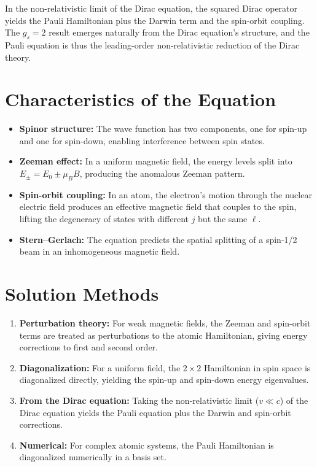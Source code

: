 In the non-relativistic limit of the Dirac equation, the squared Dirac operator yields the Pauli Hamiltonian plus the Darwin term and the spin-orbit coupling. The $g_s = 2$ result emerges naturally from the Dirac equation's structure, and the Pauli equation is thus the leading-order non-relativistic reduction of the Dirac theory.

\section*{Characteristics of the Equation}

\begin{itemize}
  \item \textbf{Spinor structure:} The wave function has two components, one for spin-up and one for spin-down, enabling interference between spin states.
  \item \textbf{Zeeman effect:} In a uniform magnetic field, the energy levels split into $E_{\pm} = E_{0} \pm \mu_{B}B$, producing the anomalous Zeeman pattern.
  \item \textbf{Spin-orbit coupling:} In an atom, the electron's motion through the nuclear electric field produces an effective magnetic field that couples to the spin, lifting the degeneracy of states with different $j$ but the same $\ell$.
  \item \textbf{Stern--Gerlach:} The equation predicts the spatial splitting of a spin-1/2 beam in an inhomogeneous magnetic field.
\end{itemize}
\section*{Solution Methods}

\begin{enumerate}
  \item \textbf{Perturbation theory:} For weak magnetic fields, the Zeeman and spin-orbit terms are treated as perturbations to the atomic Hamiltonian, giving energy corrections to first and second order.
  \item \textbf{Diagonalization:} For a uniform field, the $2\times 2$ Hamiltonian in spin space is diagonalized directly, yielding the spin-up and spin-down energy eigenvalues.
  \item \textbf{From the Dirac equation:} Taking the non-relativistic limit ($v \ll c$) of the Dirac equation yields the Pauli equation plus the Darwin and spin-orbit corrections.
  \item \textbf{Numerical:} For complex atomic systems, the Pauli Hamiltonian is diagonalized numerically in a basis set.
\end{enumerate}
